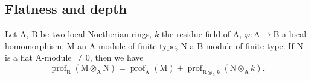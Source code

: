 \subsection{Flatness and depth}
\label{subsection:IV.6.3}

\begin{proposition}[6.3.1]
\label{IV.6.3.1}
Let $\mathrm{A}$, $\mathrm{B}$ be two local Noetherian rings, $k$ the residue field of $\mathrm{A}$, $\varphi:\mathrm{A}\to\mathrm{B}$ a local homomorphism, $\mathrm{M}$ an $\mathrm{A}$-module of finite type, $\mathrm{N}$ a $\mathrm{B}$-module of finite type.
If $\mathrm{N}$ is a flat $\mathrm{A}$-module $\neq 0$, then we have
\begin{equation}
  \operatorname{prof}_\mathrm{B}(\mathrm{M}\otimes_\mathrm{A}\mathrm{N})=\operatorname{prof}_\mathrm{A}(\mathrm{M})+\operatorname{prof}_{\mathrm{B}\otimes_\mathrm{A} k}(\mathrm{N}\otimes_\mathrm{A} k).
  \tag{6.3.1.1}
\end{equation}
\end{proposition}

